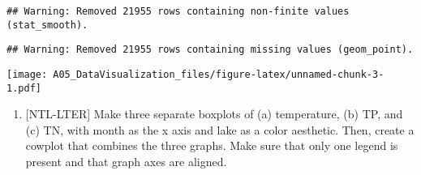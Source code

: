 \documentclass[
]{article}
\providecommand{\tightlist}{%
  \setlength{\itemsep}{0pt}\setlength{\parskip}{0pt}}
\begin{document}
\begin{verbatim}
## Warning: Removed 21955 rows containing non-finite values (stat_smooth).
\end{verbatim}

\begin{verbatim}
## Warning: Removed 21955 rows containing missing values (geom_point).
\end{verbatim}

\texttt{[image: A05\_DataVisualization\_files/figure-latex/unnamed-chunk-3-1.pdf]}

\begin{enumerate}
\def\labelenumi{\arabic{enumi}.}
\setcounter{enumi}{4}
\tightlist
\item
  {[}NTL-LTER{]} Make three separate boxplots of (a) temperature, (b)
  TP, and (c) TN, with month as the x axis and lake as a color
  aesthetic. Then, create a cowplot that combines the three graphs. Make
  sure that only one legend is present and that graph axes are aligned.
\end{enumerate}
\end{document}
